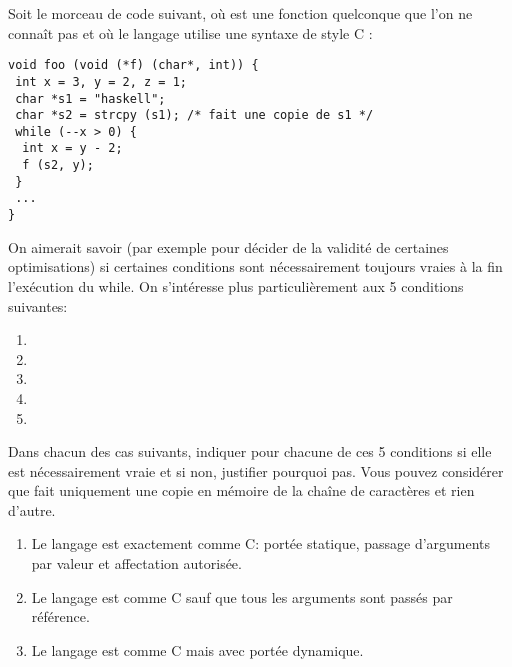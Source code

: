 \begin{Exercise}
\label{ex:fonction_raisonner3}
  Soit le morceau de code suivant, où  est une fonction
quelconque que l'on ne connaît pas et où le langage utilise une
syntaxe de style C :
\begin{verbatim}
void foo (void (*f) (char*, int)) {
 int x = 3, y = 2, z = 1;
 char *s1 = "haskell";
 char *s2 = strcpy (s1); /* fait une copie de s1 */
 while (--x > 0) {
  int x = y - 2;
  f (s2, y);
 }
 ...
}
\end{verbatim}
On aimerait savoir (par exemple pour décider de la validité de
certaines optimisations) si certaines conditions sont nécessairement
toujours vraies à la fin l'exécution du while.  On s'intéresse plus
particulièrement aux 5 conditions suivantes:
\begin{enumerate}
\item {}
\item {}
\item {}
\item {}
\item {}
\end{enumerate}
Dans chacun des cas suivants, indiquer pour chacune de ces 5 conditions
si elle est nécessairement vraie et si non, justifier pourquoi pas. Vous
pouvez considérer que  fait uniquement une copie en mémoire de la chaîne de caractères et
rien d'autre.
\begin{enumerate}
\item Le langage est exactement comme C: portée statique, passage d'arguments
  par valeur et affectation autorisée.
\item Le langage est comme C sauf que tous les arguments sont passés
  par référence.
\item Le langage est comme C mais avec portée dynamique.
\end{enumerate}
\end{Exercise}

